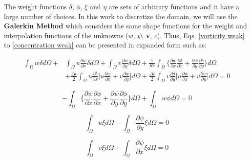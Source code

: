 The weight functions $\delta$, $\phi$, $\xi$ and $\eta$ 
are sets of arbitrary functions and it have a large number of choices. 
In this work to discretize the domain, we will use the 
\textbf{Galerkin Method} which considers the same shape functions 
for the weight and interpolation functions of the unknowns 
($w$, $\psi$, \textbf{v}, $c$). 
Thus, Eqs. \ref{vorticity weak} to \ref{concentration weak} 
can be presented in expanded form such as:

\begin{equation} 
\begin{aligned}
   \int_{\Omega} \overset{.}{w} \delta d\Omega 
 + & \int_{\Omega} u \frac{\partial w}{\partial x} \delta d\Omega 
 + \int_{\Omega} v \frac{\partial w}{\partial y} \delta d\Omega 
 + \frac{1}{\textit{Re}} \int_{\Omega} \Bigg\{ \frac{\partial w}{\partial x} \frac{\partial \delta}{\partial x} 
 + \frac{\partial w}{\partial y} \frac{\partial \delta}{\partial y} \Bigg\} d\Omega 
 \\[5pt]
 & + \frac{\Delta t}{2} \int_{\Omega} u \frac{\partial \delta}{\partial x}
 \Bigg[
   u \frac{\partial w}{\partial x}
 + v \frac{\partial w}{\partial y}
 \Bigg] d\Omega
 + \frac{\Delta t}{2} \int_{\Omega} v \frac{\partial \delta}{\partial y}
 \Bigg[
   u \frac{\partial w}{\partial x}
 + v \frac{\partial w}{\partial y}
 \Bigg] d\Omega
 = 0
\end{aligned}
\end{equation}

\begin{equation}
 - \int_{\Omega} \Bigg\{ \frac{\partial \psi}{\partial x} \frac{\partial \phi}{\partial x} 
 + \frac{\partial \psi}{\partial y} \frac{\partial \phi}{\partial y} \Bigg\} d\Omega
 + \int_{\Omega} w \phi d\Omega = 0
\end{equation}

\begin{equation}
   \int_{\Omega} u \xi d\Omega
 - \int_{\Omega} \frac{\partial \psi}{\partial y} \xi d\Omega = 0
\end{equation}

\begin{equation}
   \int_{\Omega} v \xi d\Omega
 + \int_{\Omega} \frac{\partial \psi}{\partial x} \xi d\Omega = 0
\end{equation}

